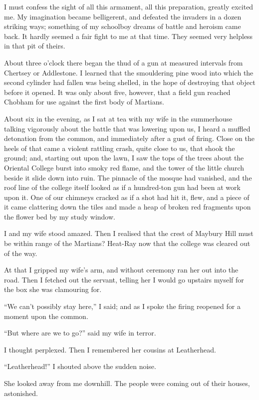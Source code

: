 I must confess the sight of all this armament, all this
preparation, greatly excited me. My imagination became belligerent,
and defeated the invaders in a dozen striking ways; something of my
schoolboy dreams of battle and heroism came back. It hardly seemed
a fair fight to me at that time. They seemed very helpless in that
pit of theirs.

About three o'clock there began the thud of a gun at measured
intervals from Chertsey or Addlestone. I learned that the
smouldering pine wood into which the second cylinder had fallen was
being shelled, in the hope of destroying that object before it
opened. It was only about five, however, that a field gun reached
Chobham for use against the first body of Martians.

About six in the evening, as I sat at tea with my wife in the
summerhouse talking vigorously about the battle that was lowering
upon us, I heard a muffled detonation from the common, and
immediately after a gust of firing. Close on the heels of that came
a violent rattling crash, quite close to us, that shook the ground;
and, starting out upon the lawn, I saw the tops of the trees about
the Oriental College burst into smoky red flame, and the tower of
the little church beside it slide down into ruin. The pinnacle of
the mosque had vanished, and the roof line of the college itself
looked as if a hundred-ton gun had been at work upon it. One of our
chimneys cracked as if a shot had hit it, flew, and a piece of it
came clattering down the tiles and made a heap of broken red
fragments upon the flower bed by my study window.

I and my wife stood amazed. Then I realised that the crest of
Maybury Hill must be within range of the Martians? Heat-Ray now
that the college was cleared out of the way.

At that I gripped my wife's arm, and without ceremony ran her out
into the road. Then I fetched out the servant, telling her I would
go upstairs myself for the box she was clamouring for.

``We can't possibly stay here,'' I said; and as I spoke the firing
reopened for a moment upon the common.

``But where are we to go?'' said my wife in terror.

I thought perplexed. Then I remembered her cousins at Leatherhead.

``Leatherhead!'' I shouted above the sudden noise.

She looked away from me downhill. The people were coming out of
their houses, astonished.

